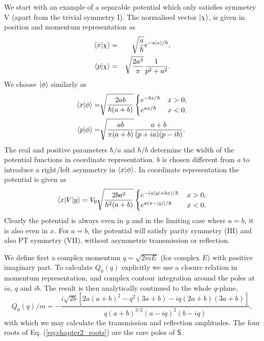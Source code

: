 We start with an example of a separable potential which only satisfies symmetry V (apart from the trivial symmetry I). The normalised vector $\ket{\chi}$, is given in position and momentum representation as
%
\begin{eqnarray}
	\braket{x}{\chi}&=&\sqrt{\frac{a}{\hbar}} e^{-a \left| x \right|/\hbar},
	\nonumber \\
	\braket{p}{\chi}&=& \sqrt{\frac{2 a^3}{\pi}} \frac{1}{p^2+a^2}.
\end{eqnarray}
%
We choose $\ket{\phi}$ similarly as
%
\begin{eqnarray}
	\braket{x}{\phi}=&\sqrt{\frac{2ab}{\hbar (a+b)}} \begin{cases}
	e^{-b x/\hbar} &x>0,\\ e^{a x/\hbar}  &x<0,
	\end{cases}\nonumber \\
	\braket{p}{\phi}=& \sqrt{\frac{ab}{\pi (a+b)}}\frac{a+b}{(p+i a)(p-i b)}.
\end{eqnarray}
%
The real and positive parameters $\hbar/ a$ and $\hbar/ b$ determine the width of the potential functions in coordinate representation.
$b$ is chosen different from $a$ to introduce a right/left  asymmetry in $\braket{x}{\phi}$.
In coordinate representation the potential is given as
%
\begin{eqnarray}
	\la x|V|y\ra = V_{0} \sqrt{\frac{2 b a^2}{\hbar^2 (a+b)}} \begin{cases}
	e^{-(a \left| y \right|+b x)/\hbar} \, &x>0,\\ e^{a (x-\left| y \right|)/\hbar} \,  &x<0.
\end{cases} \label{TRpot}
\end{eqnarray}
%
Clearly the potential is always even in $y$ and in the limiting case where $a=b$, it is also even in $x$. For $a=b$, the potential will satisfy parity symmetry (III) and also PT symmetry (VII), without asymmetric transmission or reflection.

We define first a complex momentum $q=\sqrt{2 m E}$ (for complex $E$) with positive imaginary part.
To calculate $Q_{0}(q)$ explicitly we use a closure relation in momentum representation, and
complex contour integration around the poles at $ia$, $q$ and $ib$.
The result is then analytically continued to the whole $q$-plane,
%
\begin{equation}
Q_{0}(q)/m = -\frac{i \sqrt{2b} \left[2 a (a+b)^2-q^2 (3 a+b)-i q (2 a+b) (3 a+b)\right]}{q (a+b)^{3/2} (a-i q)^2 (b-i q)},
\label{eq:chapter2_ResolvantVSymm}
\end{equation}
%
with which we may calculate the transmission and reflection amplitudes.
The four roots of Eq. (\ref{eq:chapter2_roots}) are the core poles of ${\sf S}$.

